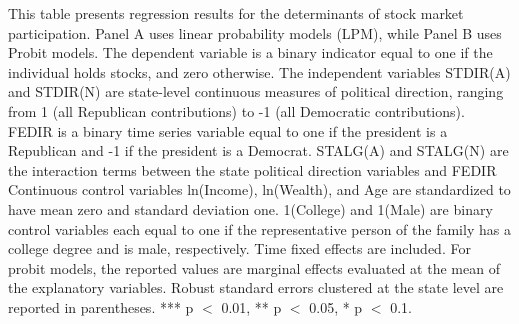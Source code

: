 \begin{table}[htbp]
    \centering
    \caption{Stock Market Participation and State Politics}
    \label{tab:3}

    \begin{minipage}{\textwidth}
    \small This table presents regression results for the determinants of stock market participation. Panel A uses linear probability models (LPM), while Panel B uses Probit models. The dependent variable is a binary indicator equal to one if the individual holds stocks, and zero otherwise. The independent variables STDIR(A) and STDIR(N) are state-level continuous measures of political direction, ranging from 1 (all Republican contributions) to -1 (all Democratic contributions). FEDIR is a binary time series variable equal to one if the president is a Republican and -1 if the president is a Democrat. STALG(A) and STALG(N) are the interaction terms between the state political direction variables and FEDIR Continuous control variables ln(Income), ln(Wealth), and Age are standardized to have mean zero and standard deviation one. 1(College) and 1(Male) are binary control variables each equal to one if the representative person of the family has a college degree and is male, respectively. Time fixed effects are included. For probit models, the reported values are marginal effects evaluated at the mean of the explanatory variables. Robust standard errors clustered at the state level are reported in parentheses. *** p $<$ 0.01, ** p $<$ 0.05, * p $<$ 0.1.
    \end{minipage}

    \small 

    \vspace{1ex}
    
    \begin{subtable}{\textwidth}
        \caption{Linear Probability Model (LPM)}
        \label{tab:3a}
        
    \end{subtable}
\end{table}

\begin{table}[htbp]
    \ContinuedFloat
    \centering

    \caption[]{Stock Market Participation and State Politics (Cont.)}
    
    \small
    
    \begin{subtable}{\textwidth}
        \caption{Probit Model}
        \label{tab:3b}
        
    \end{subtable}
    
    \vspace{1ex}

\end{table}


